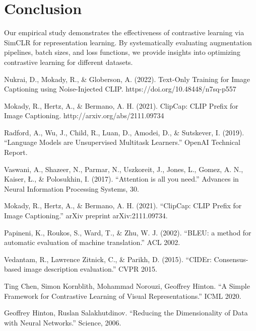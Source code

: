 \documentclass[11pt]{article}
\begin{document}
\section{Conclusion}
Our empirical study demonstrates the effectiveness of contrastive learning via SimCLR for representation
learning. By systematically evaluating augmentation pipelines, batch sizes, and loss functions, we provide
insights into optimizing contrastive learning for different datasets.
\pagebreak
\begin{thebibliography}{99}
    Nukrai, D., Mokady, R., \& Globerson, A. (2022). Text-Only Training for Image Captioning using Noise-Injected CLIP. https://doi.org/10.48448/n7sq-p557
    
    Mokady, R., Hertz, A., \& Bermano, A. H. (2021). ClipCap: CLIP Prefix for Image Captioning. http://arxiv.org/abs/2111.09734
    
    Radford, A., Wu, J., Child, R., Luan, D., Amodei, D., \& Sutskever, I. (2019). ``Language Models are Unsupervised Multitask Learners.'' OpenAI Technical Report.

    Vaswani, A., Shazeer, N., Parmar, N., Uszkoreit, J., Jones, L., Gomez, A. N., Kaiser, Ł., \& Polosukhin, I. (2017). ``Attention is all you need.'' 
    Advances in Neural Information Processing Systems, 30.

    Mokady, R., Hertz, A., \& Bermano, A. H. (2021). ``ClipCap: CLIP Prefix for Image Captioning.'' arXiv preprint arXiv:2111.09734.
    
    Papineni, K., Roukos, S., Ward, T., \& Zhu, W. J. (2002). ``BLEU: a method for automatic evaluation of machine translation.'' ACL 2002.
    
    Vedantam, R., Lawrence Zitnick, C., \& Parikh, D. (2015). ``CIDEr: Consensus-based image description evaluation.'' CVPR 2015.
    
    Ting Chen, Simon Kornblith, Mohammad Norouzi, Geoffrey Hinton. ``A Simple Framework for Contrastive Learning of Visual Representations.'' ICML 2020.
    
    Geoffrey Hinton, Ruslan Salakhutdinov. ``Reducing the Dimensionality of Data with Neural Networks.'' Science, 2006.
    \end{thebibliography}
\end{document}
